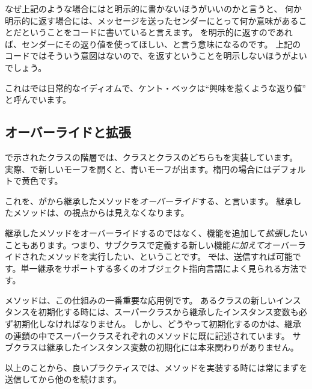 \documentclass[a4paper,10pt,twoside]{book}
\begin{document}
なぜ上記のような場合にはと明示的に書かないほうがいいのかと言うと、
何か明示的に返す場合には、メッセージを送ったセンダーにとって何か意味があることだということをコードに書いていると言えます。
\self を明示的に返すのであれば、センダーにその返り値を使ってほしい、と言う意味になるのです。
上記のコードではそういう意図はないので、\self を返すということを明示しないほうがよいでしょう。

これは\st では日常的なイディオムで、ケント・ベックは``興味を惹くような返り値'' \cite{Beck97a} と呼んでいます。


\subsection{オーバーライドと拡張}

で示されたクラスの階層では、クラスと\mbox{}クラスのどちらもを実装しています。
実際、で新しいモーフを開くと、青いモーフが出ます。楕円の場合にはデフォルトで黄色です。

これを、がから継承したメソッドを\emph{オーバーライド}する、と言います。
継承したメソッドは、の視点からは見えなくなります。

継承したメソッドをオーバーライドするのではなく、機能を追加して\emph{拡張}したいこともあります。つまり、サブクラスで定義する新しい機能\emph{に加えて}オーバーライドされたメソッドを実行したい、ということです。
\st では、\super 送信すれば可能です。単一継承をサポートする多くのオブジェクト指向言語によく見られる方法です。

メソッドは、この仕組みの一番重要な応用例です。
あるクラスの新しいインスタンスを初期化する時には、スーパークラスから継承したインスタンス変数も必ず初期化しなければなりません。
しかし、どうやって初期化するのかは、継承の連鎖の中でスーパークラスそれぞれのメソッドに既に記述されています。
サブクラスは継承したインスタンス変数の初期化には本来関わりがありません。

以上のことから、良いプラクティスでは、メソッドを実装する時には常にまずを送信してから他のを続けます。
\end{document}
